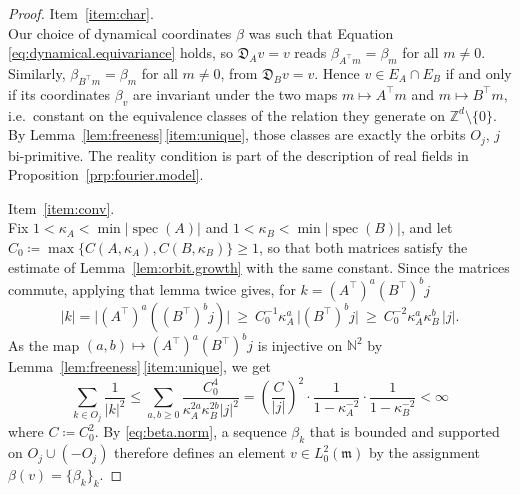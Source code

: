 \documentclass[11pt,reqno]{amsart}
\theoremstyle{plain}
\theoremstyle{definition}
\newcommand{\Z}{\mathbb{Z}}
\newcommand{\N}{\mathbb{N}}
\newcommand{\Leb}{\mathfrak{m}}
\newcommand{\D}{\mathfrak{D}}
\DeclareMathOperator{\spec}{spec}
\begin{document}
\begin{proof}
    \noindent Item~\ref{item:char}. \\
    Our choice of dynamical coordinates \(\beta\) was such that Equation \eqref{eq:dynamical.equivariance} holds, so \( \D_Av=v \) reads \( \beta_{A^{\top}m}=\beta_m \) for all \( m\neq0 \).
    Similarly, \( \beta_{B^{\top}m}=\beta_m \) for all \( m\neq0 \), from \( \D_Bv=v \).
    Hence \( v\in E_A\cap E_B \) if and only if its coordinates \( \beta_v \) are invariant under the two maps \( m\mapsto A^{\top}m \) and \( m\mapsto B^{\top}m \), i.e.\ constant on the equivalence classes of the relation they generate on \( \Z^d\setminus\{0\} \).
    By Lemma~\ref{lem:freeness}\,\ref{item:unique}, those classes are exactly the orbits \( O_j \), \( j \) bi-primitive.
    The reality condition is part of the description of real fields in Proposition~\ref{prp:fourier.model}.

    \medskip
    \noindent Item~\ref{item:conv}.\\
    Fix \(1<\kappa_A<\min\lvert\spec(A)\rvert\) and \(1<\kappa_B<\min\lvert\spec(B)\rvert\), and let \(C_0\coloneqq\max\{C(A,\kappa_A),C(B,\kappa_B)\}\ge1\), so that both matrices satisfy the estimate of Lemma~\ref{lem:orbit.growth} with the same constant.
    Since the matrices commute, applying that lemma twice gives, for \(k=(A^\top)^a(B^\top)^bj\)
    \[
        \lvert k \rvert=\big\lvert (A^{\top})^{a}\left((B^{\top})^{b}j\right)\big \rvert  \ \ge\ C_0^{-1}\kappa_A^{a}\,\big\lvert (B^{\top})^{b}j\big \rvert \ \ge\ C_0^{-2}\kappa_A^{a}\kappa_B^{b}\,\lvert j \rvert .
    \]
    As the map \( (a,b)\mapsto(A^{\top})^{a}(B^{\top})^{b}j \) is injective on \( \N^2 \) by Lemma~\ref{lem:freeness}\,\ref{item:unique}, we get
    \[
        \sum_{k\in O_j}\frac{1}{\lvert k \rvert^{2}}
        \le\sum_{a,b\ge0}\frac{C_0^{4}}{\kappa_A^{2a}\kappa_B^{2b}\lvert j \rvert^{2}}
        =\left(\frac{C}{\lvert j \rvert}\right)^2\cdot\frac{1}{1-\kappa_A^{-2}}\cdot
        \frac{1}{1-\kappa_B^{-2}}<\infty
    \]
    where \(C \coloneqq C_0^2\).
    By \eqref{eq:beta.norm}, a sequence \( \beta_k \) that is bounded and supported on \( O_j\cup(-O_j) \) therefore defines an element \(v \in  L^2_0(\Leb) \) by the assignment \(\beta(v) = \{\beta_k\}_k\).


\end{proof}
\end{document}
